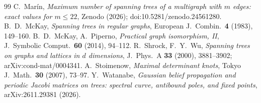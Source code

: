 \documentclass[11pt]{amsart}
\theoremstyle{plain}
\theoremstyle{remark}
\begin{document}
\begin{thebibliography}{99}
 C.~Mar\'in, \emph{Maximum number of spanning trees of a multigraph with $m$ edges: exact values for
  $m\le22$}, Zenodo (2026); doi:10.5281/zenodo.24561280.
 B.~D.~McKay, \emph{Spanning trees in regular graphs}, European J.\ Combin.\ \textbf{4} (1983),
  149--160.
 B.~D.~McKay, A.~Piperno, \emph{Practical graph isomorphism, II}, J.\ Symbolic Comput.\ \textbf{60}
  (2014), 94--112.
 R.~Shrock, F.~Y.~Wu, \emph{Spanning trees on graphs and lattices in $d$ dimensions}, J.\ Phys.\ A
  \textbf{33} (2000), 3881--3902; arXiv:cond-mat/0004341.
 A.~Stoimenow, \emph{Maximal determinant knots}, Tokyo J.\ Math.\ \textbf{30} (2007), 73--97.
 Y.~Watanabe, \emph{Gaussian belief propagation and periodic Jacobi matrices on trees: spectral
  curve, antibound poles, and fixed points}, arXiv:2611.29381 (2026).
\end{thebibliography}
\end{document}
